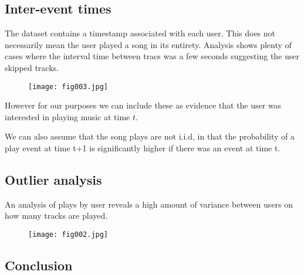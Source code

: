 \subsection{Inter-event times}

The dataset contains a timestamp associated with each user. This does not necessarily mean the user played a song in its entirety. Analysis shows plenty of cases where the interval time between tracs was a few seconds suggesting the user skipped tracks.

\begin{figure}[h!]
	\centering
	\texttt{[image: fig003.jpg]}
	\caption{}
	\label{fig:fig3}
\end{figure} 

However for our purposes we can include these as evidence that the user was interested in playing music at time $t$.

We can also assume that the song plays are not i.i.d, in that the probability of a play event at time t+1 is significantly higher if there was an event at time t. 

\subsection{Outlier analysis}

An analysis of plays by user reveals a high amount of variance between users on how many tracks are played. 
\begin{figure}[h!]
	\centering
	\texttt{[image: fig002.jpg]}
	\caption{}
	\label{fig:fig2}
\end{figure} 

\subsection{Conclusion}
